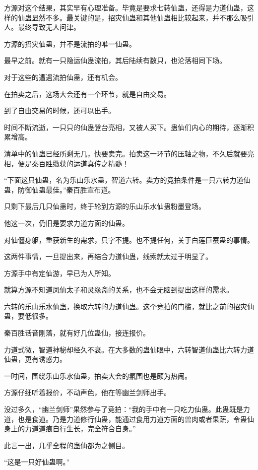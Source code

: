 \begin{this_body}
方源对这个结果，其实早有心理准备。毕竟是要求七转仙蛊，还得是力道仙蛊，这样的仙蛊显然不多。最关键的是，招灾仙蛊和其他仙蛊相比较起来，并不那么吸引人。最终导致无人问津。

方源的招灾仙蛊，并不是流拍的唯一仙蛊。

最早之前。就有一只隐运仙蛊流拍，其后陆续有数只，也沦落相同下场。

对于这些的遭遇流拍仙蛊，还有机会。

在拍卖之后，这场大会还有一个环节，就是自由交易。

到了自由交易的时候，还可以出手。

时间不断流逝，一只只的仙蛊登台亮相，又被人买下。蛊仙们内心的期待，逐渐积累增高。

清单中的仙蛊已经所剩无几，快要卖完。拍卖这一环节的压轴之物，不久后就要亮相，便是秦百胜缴获的运道真传之精髓！

“下面这只仙蛊，名为乐山乐水蛊，智道六转。卖方的竞拍条件是一只六转力道仙蛊，防御仙蛊最佳。”秦百胜宣布道。

只剩下最后几只仙蛊时，终于轮到方源的乐山乐水仙蛊粉墨登场。

他这一次，仍旧是要求力道方面的仙蛊。

对仙僵身躯，重获新生的需求，只字不提。也不提任何，关于白莲巨蚕蛊的事情。

这两件事情，一旦提出来，再结合力道仙蛊，线索就太过于明显了。

方源手中有定仙游，早已为人所知。

就算方源不知道凤仙太子和灵缘斋的关系，也不会无脑到提出这样的需求。

六转的乐山乐水仙蛊，换取六转的力道仙蛊。这个竞拍的门槛，就比之前的招灾仙蛊，要低很多。

秦百胜话音刚落，就有好几位蛊仙，接连报价。

力道式微，智道神秘却经久不衰。在大多数的蛊仙眼中，六转智道仙蛊比六转力道仙蛊，更有诱惑力。

一时间，围绕乐山乐水仙蛊，拍卖大会的氛围也是颇为热闹。

方源仔细听着报价，不动声色，他在等幽兰剑师出手。

没过多久，“幽兰剑师”果然参与了竞拍：“我的手中有一只吃力仙蛊。此蛊既是力道，也是食道。乃是力道修行仙蛊，能通过食用力道方面的兽肉或者果蔬，令蛊仙身上的力道道痕自行生长，完全符合自身。”

此言一出，几乎全程的蛊仙都为之侧目。

“这是一只好仙蛊啊。”


\end{this_body}
